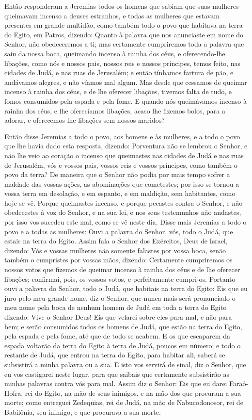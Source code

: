 Então responderam a Jeremias todos os homens que sabiam que suas
mulheres queimavam incenso a deuses estranhos, e todas as mulheres
que estavam presentes em grande multidão, como também todo o povo
que habitava na terra do Egito, em Patros, dizendo: Quanto à
palavra que nos anunciaste em nome do Senhor, não obedeceremos a ti;
mas certamente cumpriremos toda a palavra que saiu da nossa
boca, queimando incenso à rainha dos céus, e oferecendo-lhe
libações, como nós e nossos pais, nossos reis e nossos príncipes,
temos feito, nas cidades de Judá, e nas ruas de Jerusalém; e então
tínhamos fartura de pão, e andávamos alegres, e não víamos mal
algum. Mas desde que cessamos de queimar incenso à rainha dos
céus, e de lhe oferecer libações, tivemos falta de tudo, e fomos
consumidos pela espada e pela fome. E quando nós queimávamos
incenso à rainha dos céus, e lhe oferecíamos libações, acaso lhe
fizemos bolos, para a adorar, e oferecemos-lhe libações sem nossos
maridos?

Então disse Jeremias a todo o povo, aos homens e às mulheres, e a
todo o povo que lhe havia dado esta resposta, dizendo:
Porventura não se lembrou o Senhor, e não lhe veio ao coração
o incenso que queimastes nas cidades de Judá e nas ruas de
Jerusalém, vós e vossos pais, vossos reis e vossos príncipes, como
também o povo da terra? De maneira que o Senhor não podia por
mais tempo sofrer a maldade das vossas ações, as abominações que
cometestes; por isso se tornou a vossa terra em desolação, e em
espanto, e em maldição, sem habitantes, como hoje se vê.
Porque queimastes incenso, e porque pecastes contra o Senhor,
e não obedecestes à voz do Senhor, e na sua lei, e nos seus
testemunhos não andastes, por isso vos sucedeu este mal, como se vê
neste dia. Disse mais Jeremias a todo o povo e a todas as
mulheres: Ouvi a palavra do Senhor, vós, todo o Judá, que estais na
terra do Egito. Assim fala o Senhor dos Exércitos, Deus de
Israel, dizendo: Vós e vossas mulheres não somente falastes por
vossa boca, senão também o cumpristes por vossas mãos, dizendo:
Certamente cumpriremos os nossos votos que fizemos de queimar
incenso à rainha dos céus e de lhe oferecer libações; confirmai,
pois, os vossos votos, e perfeitamente cumpri-os. Portanto
ouvi a palavra do Senhor, todo o Judá, que habitais na terra do
Egito: Eis que eu juro pelo meu grande nome, diz o Senhor, que nunca
mais será pronunciado o meu nome pela boca de nenhum homem de Judá
em toda a terra do Egito dizendo: Vive o Senhor Deus! Eis que
velarei sobre eles para mal, e não para bem; e serão consumidos
todos os homens de Judá, que estão na terra do Egito, pela espada e
pela fome, até que de todo se acabem. E os que escaparem da
espada voltarão da terra do Egito à terra de Judá, poucos em número;
e todo o restante de Judá, que entrou na terra do Egito, para
habitar ali, saberá se subsistirá a minha palavra ou a sua. E
isto vos servirá de sinal, diz o Senhor, que eu vos castigarei neste
lugar, para que saibais que certamente subsistirão as minhas
palavras contra vós para mal. Assim diz o Senhor: Eis que eu
darei Faraó-Hofra, rei do Egito, na mão de seus inimigos, e na mão
dos que procuram a sua morte; como entreguei Zedequias, rei de Judá,
na mão de Nabucodonosor, rei de Babilônia, seu inimigo, e que
procurava a sua morte.

